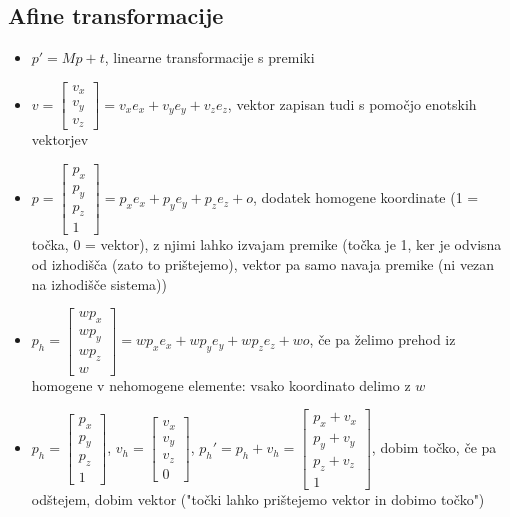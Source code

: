 \documentclass{article}
\begin{document}
\subsection{Afine transformacije}
\begin{itemize}
    \item $p' = Mp + t$, linearne transformacije s premiki
    \item $v = \begin{bmatrix} v_x \\ v_y \\ v_z \end{bmatrix} = v_xe_x + v_ye_y + v_ze_z$, vektor zapisan tudi s pomočjo enotskih vektorjev
    \item $p = \begin{bmatrix} p_x \\ p_y \\ p_z \\ 1 \end{bmatrix} = p_xe_x + p_ye_y + p_ze_z + o$, dodatek homogene koordinate (1 = točka, 0 = vektor), z njimi lahko izvajam premike (točka je 1, ker je odvisna od izhodišča (zato to prištejemo), vektor pa samo navaja premike (ni vezan na izhodišče sistema))
    \item $p_h = \begin{bmatrix} wp_x \\ wp_y \\ wp_z \\ w \end{bmatrix} = wp_xe_x + wp_ye_y + wp_ze_z + wo$, če pa želimo prehod iz homogene v nehomogene elemente: vsako koordinato delimo z $w$
    \item $p_h = \begin{bmatrix} p_x \\ p_y \\ p_z \\ 1 \end{bmatrix}$, $v_h = \begin{bmatrix} v_x \\ v_y \\ v_z \\ 0 \end{bmatrix}$, $p_h' = p_h + v_h = \begin{bmatrix} p_x + v_x \\ p_y + v_y \\ p_z + v_z \\ 1 \end{bmatrix}$, dobim točko, če pa odštejem, dobim vektor ("točki lahko prištejemo vektor in dobimo točko")

\end{itemize}
\end{document}
